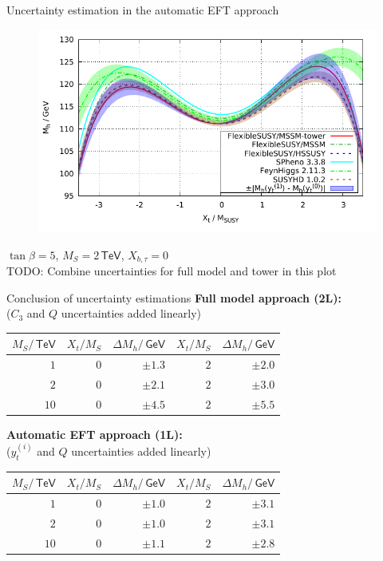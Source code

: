 \documentclass[hyperref={pdfpagelabels=false},ngerman]{beamer}
\newcommand{\eh}[1]{\,\mathsf{#1}}
\renewcommand{\emph}{\textbf}
\begin{document}
\begin{frame}{Uncertainty estimation in the automatic EFT approach}
  \begin{figure}
    \centering
    \includegraphics[width=\textwidth]{plots/xt_MSSM_MS-2000_uncertainty}
  \end{figure}
  $\tan\beta = 5$, $M_S = 2\eh{TeV}$, $X_{b,\tau} = 0$
  \\TODO: Combine uncertainties for full model and tower in this plot
\end{frame}

\begin{frame}{Conclusion of uncertainty estimations}
  \emph{Full model approach (2L):}\\
  ($C_3$ and $Q$ uncertainties added linearly)
  \begin{table}
    \centering
    \begin{tabular}{rrr|rr}
      $M_S / \eh{TeV}$ & $X_t / M_S$ & $\Delta M_h / \eh{GeV}$ & $X_t / M_S$ & $\Delta M_h / \eh{GeV}$ \\
      \midrule
      $1$  & $0$ & $\pm 1.3$ & $2$ & $\pm 2.0$\\
      $2$  & $0$ & $\pm 2.1$ & $2$ & $\pm 3.0$\\
      $10$ & $0$ & $\pm 4.5$ & $2$ & $\pm 5.5$\\
    \end{tabular}
  \end{table}
  \emph{Automatic EFT approach (1L):}\\
  ($y_t^{(i)}$ and $Q$ uncertainties added linearly)
  \begin{table}
    \centering
    \begin{tabular}{rrr|rr}
      $M_S / \eh{TeV}$ & $X_t / M_S$ & $\Delta M_h / \eh{GeV}$ & $X_t / M_S$ & $\Delta M_h / \eh{GeV}$ \\
      \midrule
      $1$  & $0$ & $\pm 1.0$ & $2$ & $\pm 3.1$\\
      $2$  & $0$ & $\pm 1.0$ & $2$ & $\pm 3.1$\\
      $10$ & $0$ & $\pm 1.1$ & $2$ & $\pm 2.8$\\
    \end{tabular}
  \end{table}
\end{frame}
\end{document}
